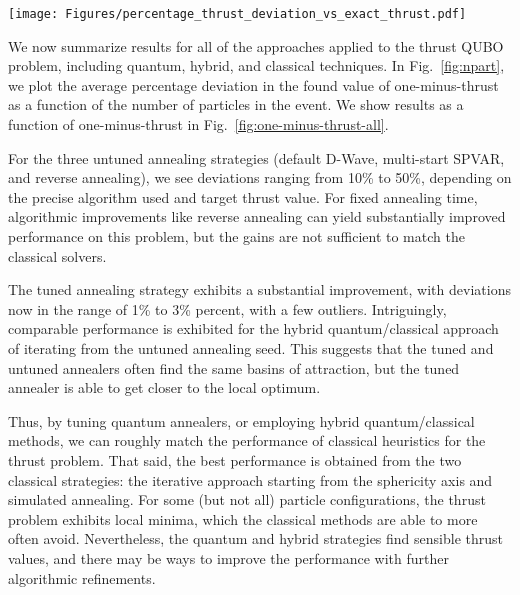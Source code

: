 \documentclass[aps,prd,twocolumn,superscriptaddress,preprintnumbers,nofootinbib,longbibliography,floatfix]{revtex4-1}
\DeclareRobustCommand{\Fig}[1]{Fig.~\ref{fig:#1}}
\begin{document}
\begin{figure*}[p]
    \centering
    \texttt{[image: Figures/percentage\_thrust\_deviation\_vs\_exact\_thrust.pdf]}
    \caption{
    Same as \Fig{npart} but now plotted as a function of the exact one-minus-thrust.
    }
    \label{fig:one-minus-thrust-all}
\end{figure*}


We now summarize results for all of the approaches applied to the thrust QUBO problem, including quantum, hybrid, and classical techniques.
%
In \Fig{npart}, we plot the average percentage deviation in the found value of one-minus-thrust as a function of the number of particles in the event.
%
We show results as a function of one-minus-thrust in \Fig{one-minus-thrust-all}.


For the three untuned annealing strategies (default D-Wave, multi-start SPVAR, and reverse annealing), we see deviations ranging from 10\% to 50\%, depending on the precise algorithm used and target thrust value.
%
For fixed annealing time, algorithmic improvements like reverse annealing can yield substantially improved performance on this problem, but the gains are not sufficient to match the classical solvers.


The tuned annealing strategy exhibits a substantial improvement, with deviations now in the range of 1\% to 3\% percent, with a few outliers.
%
Intriguingly, comparable performance is exhibited for the hybrid quantum/classical approach of iterating from the untuned annealing seed.
%
This suggests that the tuned and untuned annealers often find the same basins of attraction, but the tuned annealer is able to get closer to the local optimum.


Thus, by tuning quantum annealers, or employing hybrid quantum/classical methods, we can roughly match the performance of classical heuristics for the thrust problem.
%
That said, the best performance is obtained from the two classical strategies: the iterative approach starting from the sphericity axis and simulated annealing.
%
For some (but not all) particle configurations, the thrust problem exhibits local minima, which the classical methods are able to more often avoid.
%
Nevertheless, the quantum and hybrid strategies find sensible thrust values, and there may be ways to improve the performance with further algorithmic refinements.
\end{document}
